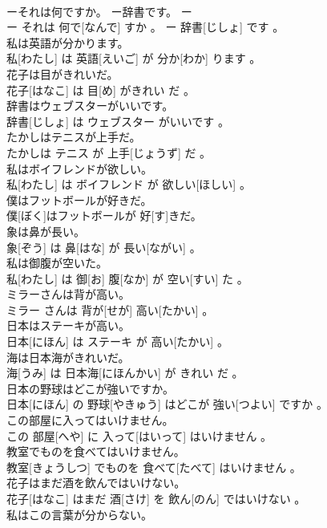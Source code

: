 \documentclass[8pt]{extreport}
\begin{document}
\begin{CJK}{UTF8}{min}
\\	ーそれは何ですか。 ー辞書です。	ー
\\	ー それは 何で[なんで] すか 。 ー 辞書[じしょ] です 。
\\	私は英語が分かります。	
\\	私[わたし] は 英語[えいご] が 分か[わか] ります 。
\\	花子は目がきれいだ。	
\\	花子[はなこ] は 目[め] がきれい だ 。
\\	辞書はウェブスターがいいです。	
\\	辞書[じしょ] は ウェブスター がいいです 。
\\	たかしはテニスが上手だ。	
\\	たかしは テニス が 上手[じょうず] だ 。
\\	私はボイフレンドが欲しい。	
\\	私[わたし] は ボイフレンド が 欲しい[ほしい] 。
\\	僕はフットボールが好きだ。	
\\	僕[ぼく]はフットボールが 好[す]きだ。
\\	象は鼻が長い。	
\\	象[ぞう] は 鼻[はな] が 長い[ながい] 。
\\	私は御腹が空いた。	
\\	私[わたし] は 御[お] 腹[なか] が 空い[すい] た 。
\\	ミラーさんは背が高い。	
\\	ミラー さんは 背が[せが] 高い[たかい] 。
\\	日本はステーキが高い。	
\\	日本[にほん] は ステーキ が 高い[たかい] 。
\\	海は日本海がきれいだ。	
\\	海[うみ] は 日本海[にほんかい] が きれい だ 。
\\	日本の野球はどこが強いですか。	
\\	日本[にほん] の 野球[やきゅう] はどこが 強い[つよい] ですか 。
\\	この部屋に入ってはいけません。	
\\	この 部屋[へや] に 入って[はいって] はいけません 。
\\	教室でものを食べてはいけません。	
\\	教室[きょうしつ] でものを 食べて[たべて] はいけません 。
\\	花子はまだ酒を飲んではいけない。	
\\	花子[はなこ] はまだ 酒[さけ] を 飲ん[のん] ではいけない 。
\\	私はこの言葉が分からない。	

\end{CJK}
\end{document}
